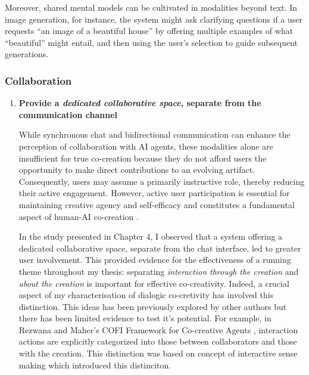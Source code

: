 \begin{enumerate}
Moreover, shared mental models can be cultivated in modalities beyond text. In image generation, for instance, the system might ask clarifying questions if a user requests “an image of a beautiful house” by offering multiple examples of what “beautiful” might entail, and then using the user’s selection to guide subsequent generations.

    
\end{enumerate}

    
\subsubsection{Collaboration}

\begin{enumerate}

\item \textbf{Provide a \textit{dedicated collaborative space}, separate from the communication channel}

While synchronous chat and bidirectional communication can enhance the perception of collaboration with AI agents, these modalities alone are insufficient for true co-creation because they do not afford users the opportunity to make direct contributions to an evolving artifact. Consequently, users may assume a primarily instructive role, thereby reducing their active engagement. However, active user participation is essential for maintaining creative agency and self-efficacy \cite{McGuire2024-im} and constitutes a fundamental aspect of human-AI co-creation \cite{Kantosalo2016-hg}.

In the study presented in Chapter 4, I observed that a system offering a dedicated collaborative space, separate from the chat interface, led to greater user involvement. This provided evidence for the effectiveness of a running theme throughout my thesis: separating \textit{interaction through the creation} and \textit{about the creation} is important for effective co-creativity. Indeed, a crucial aspect of my characterisation of dialogic co-cretivity has involved this distinction. This ideas has been previously explored by other authors but there has been limited evidence to test it's potential. For example, in Rezwana and Maher’s COFI Framework for Co-creative Agents \cite{Rezwana2022-gg}, interaction actions are explicitly categorized into those between collaborators and those with the creation. This distinction was based on \cite{Kellas2005-lc} concept of interactive sense making which introduced this distinciton. 


\end{enumerate}

